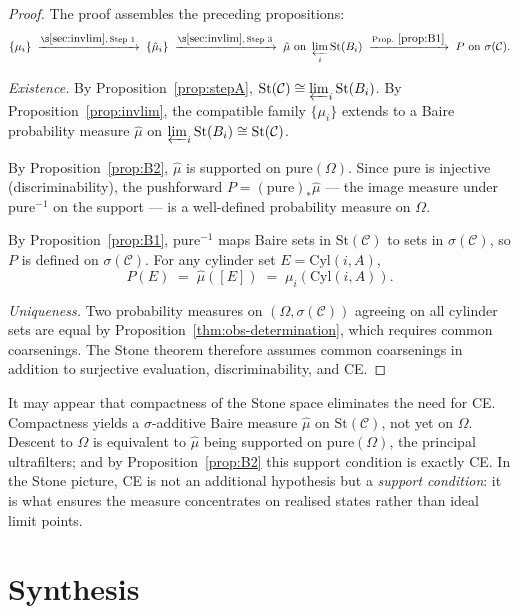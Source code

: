 \begin{proof}
The proof assembles the preceding propositions:
\[
  \{\mu_i\}
  \;\xrightarrow{\S\ref{sec:invlim},\,\text{Step~1}}\;
  \{\hat{\mu}_i\}
  \;\xrightarrow{\S\ref{sec:invlim},\,\text{Step~3}}\;
  \hat{\mu} \text{ on } \varprojlim_i \mathrm{St}(B_i)
  \;\xrightarrow{\text{Prop.}~\ref{prop:B1}}\;
  P \text{ on } \sigma(\mathcal{C}).
\]

\textit{Existence.}
By Proposition~\ref{prop:stepA}, $\mathrm{St}(\mathcal{C}) \cong \varprojlim_i \mathrm{St}(B_i)$. By Proposition~\ref{prop:invlim}, the compatible family $\{\mu_i\}$ extends to a Baire probability measure $\hat{\mu}$ on $\varprojlim_i \mathrm{St}(B_i) \cong \mathrm{St}(\mathcal{C})$.

By Proposition~\ref{prop:B2}, $\hat{\mu}$ is supported on $\mathrm{pure}(\Omega)$.  Since $\mathrm{pure}$ is injective (discriminability), the pushforward $P = (\mathrm{pure})_*\hat{\mu}$ --- the image measure under $\mathrm{pure}^{-1}$ on the support --- is a well-defined probability measure on $\Omega$.

By Proposition~\ref{prop:B1}, $\mathrm{pure}^{-1}$ maps Baire sets in $\mathrm{St}(\mathcal{C})$ to sets in $\sigma(\mathcal{C})$, so $P$ is defined on $\sigma(\mathcal{C})$.  For any cylinder set $E = \mathrm{Cyl}(i, A)$,
\[
  P(E) \;=\; \hat{\mu}([E]) \;=\; \mu_i(\mathrm{Cyl}(i, A)).
\]

\textit{Uniqueness.}
Two probability measures on $(\Omega, \sigma(\mathcal{C}))$ agreeing on all cylinder sets are equal by Proposition~\ref{thm:obs-determination}, which requires common coarsenings.  The Stone theorem therefore assumes common coarsenings in addition to surjective evaluation, discriminability, and CE.
\end{proof}

\noindent It may appear that compactness of the Stone space eliminates the need
for CE.  Compactness yields a $\sigma$-additive Baire measure $\hat{\mu}$ on $\mathrm{St}(\mathcal{C})$, not yet on $\Omega$.  Descent to $\Omega$ is equivalent to $\hat{\mu}$ being supported on $\mathrm{pure}(\Omega)$, the principal ultrafilters; and by Proposition~\ref{prop:B2} this support condition is exactly CE.  In the Stone picture, CE is not an additional hypothesis but a \emph{support condition}: it is what ensures the measure concentrates on realised states rather than ideal limit points.


\section{Synthesis}
\label{sec:bridge}

